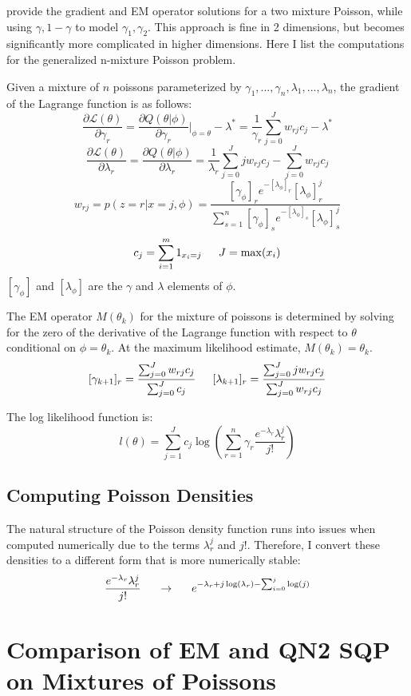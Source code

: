 \documentclass[letter,12pt]{article}
\begin{document}
\cite{jamshidianj97} provide the gradient and EM operator solutions for a two mixture Poisson, while using $\gamma,1-\gamma$ to model $\gamma_1,\gamma_2$.  This approach is fine in 2 dimensions, but becomes significantly more complicated in higher dimensions.  Here I list the computations for the generalized n-mixture Poisson problem.

Given a mixture of $n$ poissons parameterized by $\gamma_1,...,\gamma_n,\lambda_1,...,\lambda_n$, the gradient of the Lagrange function is as follows:
\[
\frac{\partial \mathcal{L}(\theta)}{\partial \gamma_r}
=
\frac{\partial Q(\theta|\phi)}{\partial \gamma_r}|_{\phi=\theta} - \lambda^*
=
\frac{1}{\gamma_r} \sum_{j=0}^{J}w_{rj}c_j - \lambda^*
\]
\[
\frac{\partial \mathcal{L}(\theta)}{\partial \lambda_r}
=
\frac{\partial Q(\theta|\phi)}{\partial \lambda_r}
=
\frac{1}{\lambda_r} \sum_{j=0}^{J}jw_{rj}c_j - \sum_{j=0}^{J}w_{rj}c_j
\]
\[
w_{rj}=p(z=r|x=j,\phi)=\frac{[\gamma_{\phi}]_r e^{-[\lambda_{\phi}]_r}[\lambda_{\phi}]_r^j}{\sum_{s=1}^{n}[\gamma_{\phi}]_s e^{-[\lambda_{\phi}]_s}[\lambda_{\phi}]_s^j}
\]
\[
c_j = \sum_{i=1}^{m}1_{x_i=j}
\indent
J = \max(x_i)
\]
$[\gamma_{\phi}]$ and $[\lambda_{\phi}]$ are the $\gamma$ and $\lambda$ elements of $\phi$.

The EM operator $M(\theta_k)$ for the mixture of poissons is determined by solving for the zero of the derivative of the Lagrange function with respect to $\theta$ conditional on $\phi=\theta_k$.  At the maximum likelihood estimate, $M(\theta_k)=\theta_k$.
\[
[\gamma_{k+1}]_r = \frac{\sum_{j=0}^{J}w_{rj}c_j}{\sum_{j=0}^{J}c_j}
\indent
[\lambda_{k+1}]_r = \frac{\sum_{j=0}^{J}jw_{rj}c_j}{\sum_{j=0}^{J}w_{rj}c_j}
\]

The log likelihood function is:
\[
l(\theta) = \sum_{j=1}^{J}c_j\log\left({\sum_{r=1}^{n}\gamma_r\frac{e^{-\lambda_r}\lambda_r^j}{j!}}\right)
\]

\subsection{Computing Poisson Densities}

The natural structure of the Poisson density function runs into issues when computed numerically due to the terms $\lambda_r^j$ and $j!$.  Therefore, I convert these densities to a different form that is more numerically stable:
\[
\frac{e^{-\lambda_r}\lambda_r^j}{j!}
\indent
\rightarrow
\indent
e^{-\lambda_r+j\log(\lambda_r)-\sum_{i=0}^{j}\log(j)}
\]

\section{Comparison of EM and QN2 SQP on Mixtures of Poissons}
\end{document}
